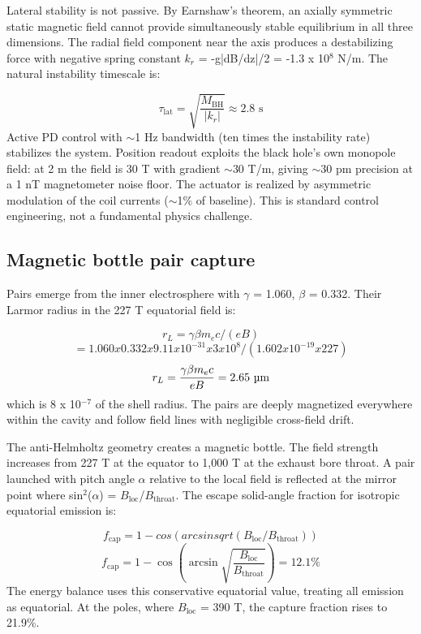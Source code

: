 \documentclass[12pt,a4paper]{article}
\begin{document}
Lateral stability is not passive. By Earnshaw's theorem, an axially symmetric static magnetic field cannot provide simultaneously stable equilibrium in all three dimensions. The radial field component near the axis produces a destabilizing force with negative spring constant $k_r$ = -g|dB/dz|/2 = -1.3 x 10$^{8}$ N/m. The natural instability timescale is:

\begin{equation}
\tau_\text{lat} = \sqrt{\frac{M_\text{BH}}{|k_r|}} \approx 2.8 \text{ s}
\end{equation}
Active PD control with $\sim$1 Hz bandwidth (ten times the instability rate) stabilizes the system. Position readout exploits the black hole's own monopole field: at 2 m the field is 30 T with gradient $\sim$30 T/m, giving $\sim$30 pm precision at a 1 nT magnetometer noise floor. The actuator is realized by asymmetric modulation of the coil currents ($\sim$1\% of baseline). This is standard control engineering, not a fundamental physics challenge.

\subsection{Magnetic bottle pair capture}
Pairs emerge from the inner electrosphere with $\gamma$ = 1.060, $\beta$ = 0.332. Their Larmor radius in the 227 T equatorial field is:

\[
r_L = \gamma{}\beta{}m_e c/(eB)
\]
\[
= 1.060 x 0.332 x 9.11 x 10^{-31} x 3 x 10^{8}/(1.602 x 10^{-19} x 227)
\]
\begin{equation}
r_L = \frac{\gamma \beta m_e c}{eB} = 2.65 \text{ \textmu m}
\end{equation}
which is 8 x 10$^{-7}$ of the shell radius. The pairs are deeply magnetized everywhere within the cavity and follow field lines with negligible cross-field drift.

The anti-Helmholtz geometry creates a magnetic bottle. The field strength increases from 227 T at the equator to 1,000 T at the exhaust bore throat. A pair launched with pitch angle $\alpha$ relative to the local field is reflected at the mirror point where sin$^{2}$($\alpha$) = $B_{\text{loc}}$/$B_{\text{throat}}$. The escape solid-angle fraction for isotropic equatorial emission is:

\[
f_{\text{cap}} = 1 - cos(arcsin sqrt(B_{\text{loc}}/B_{\text{throat}}))
\]
\begin{equation}
f_\text{cap} = 1 - \cos\!\left(\arcsin\sqrt{\frac{B_\text{loc}}{B_\text{throat}}}\right) = 12.1\%
\end{equation}
The energy balance uses this conservative equatorial value, treating all emission as equatorial. At the poles, where $B_{\text{loc}}$ = 390 T, the capture fraction rises to 21.9\%.
\end{document}
